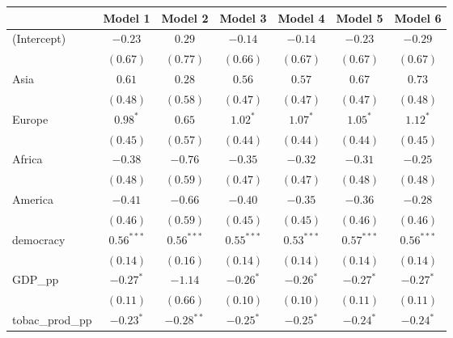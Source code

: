 
\begin{table}[!h]
\begin{center}
\begin{tabular}{l c c c c c c }
\toprule
 & Model 1 & Model 2 & Model 3 & Model 4 & Model 5 & Model 6 \\
\midrule
(Intercept)             & $-0.23$      & $0.29$       & $-0.14$      & $-0.14$      & $-0.23$      & $-0.29$      \\
                        & $(0.67)$     & $(0.77)$     & $(0.66)$     & $(0.67)$     & $(0.67)$     & $(0.67)$     \\
Asia                    & $0.61$       & $0.28$       & $0.56$       & $0.57$       & $0.67$       & $0.73$       \\
                        & $(0.48)$     & $(0.58)$     & $(0.47)$     & $(0.47)$     & $(0.47)$     & $(0.48)$     \\
Europe                  & $0.98^{*}$   & $0.65$       & $1.02^{*}$   & $1.07^{*}$   & $1.05^{*}$   & $1.12^{*}$   \\
                        & $(0.45)$     & $(0.57)$     & $(0.44)$     & $(0.44)$     & $(0.44)$     & $(0.45)$     \\
Africa                  & $-0.38$      & $-0.76$      & $-0.35$      & $-0.32$      & $-0.31$      & $-0.25$      \\
                        & $(0.48)$     & $(0.59)$     & $(0.47)$     & $(0.47)$     & $(0.48)$     & $(0.48)$     \\
America                 & $-0.41$      & $-0.66$      & $-0.40$      & $-0.35$      & $-0.36$      & $-0.28$      \\
                        & $(0.46)$     & $(0.59)$     & $(0.45)$     & $(0.45)$     & $(0.46)$     & $(0.46)$     \\
democracy               & $0.56^{***}$ & $0.56^{***}$ & $0.55^{***}$ & $0.53^{***}$ & $0.57^{***}$ & $0.56^{***}$ \\
                        & $(0.14)$     & $(0.16)$     & $(0.14)$     & $(0.14)$     & $(0.14)$     & $(0.14)$     \\
GDP\_pp                 & $-0.27^{*}$  & $-1.14$      & $-0.26^{*}$  & $-0.26^{*}$  & $-0.27^{*}$  & $-0.27^{*}$  \\
                        & $(0.11)$     & $(0.66)$     & $(0.10)$     & $(0.10)$     & $(0.11)$     & $(0.11)$     \\
tobac\_prod\_pp         & $-0.23^{*}$  & $-0.28^{**}$ & $-0.25^{*}$  & $-0.25^{*}$  & $-0.24^{*}$  & $-0.24^{*}$  \\

\end{tabular}
\end{center}
\end{table}
